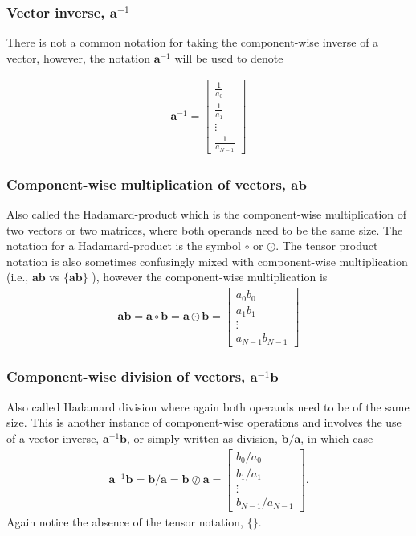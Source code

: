 \documentclass[11pt,letterpaper,titlepage]{article}
\newcommand{\beqn}{\begin{equation}
	\begin{aligned}}
\newcommand{\eeqn}{\end{aligned}
	\end{equation}}
\numberwithin{equation}{section}
\begin{document}
\subsubsection{Vector inverse, $\mathbf{a}^{-1}$}
There is not a common notation for taking the component-wise inverse of a vector, however, the notation $\mathbf{a}^{-1}$ will be used to denote

\beqn
\mathbf{a}^{-1} = 
\begin{bmatrix}
\frac{1}{a_0} \\
\frac{1}{a_1} \\
\vdots  \\
\frac{1}{a_{N-1}}
\end{bmatrix}
\eeqn 

\subsubsection{Component-wise multiplication of vectors, $\mathbf{a}\mathbf{b}$}
Also called the Hadamard-product which is the component-wise multiplication of two vectors or two matrices, where both operands need to be the same size. The notation for a Hadamard-product is the symbol $\circ$ or $\odot$. The tensor product notation is also sometimes confusingly mixed with component-wise multiplication (i.e., $\mathbf{a}\mathbf{b}$ vs $\{ \mathbf{a}\mathbf{b} \}$ ), however the component-wise multiplication is
\beqn
\mathbf{a}\mathbf{b} = 
\mathbf{a} \circ \mathbf{b} = 
\mathbf{a} \odot \mathbf{b} = 
\begin{bmatrix}
a_0 b_0 \\
a_1 b_1 \\
\vdots \\
a_{N-1}b_{N-1}
\end{bmatrix}
\eeqn

\subsubsection{Component-wise division of vectors, $\mathbf{a}^{-1}\mathbf{b}$}
Also called Hadamard division where again both operands need to be of the same size. This is another instance of component-wise operations and involves the use of a vector-inverse, $\mathbf{a}^{-1}\mathbf{b}$, or simply written as division, $\mathbf{b}/\mathbf{a}$, in which case
\beqn
\mathbf{a}^{-1}\mathbf{b} =
\mathbf{b}/\mathbf{a} =  
\mathbf{b} \oslash \mathbf{a} =
\begin{bmatrix}
b_0/a_0  \\
b_1/a_1 \\
\vdots \\
b_{N-1}/a_{N-1}
\end{bmatrix}.
\eeqn
Again notice the absence of the tensor notation, $\{\}$.
\end{document}
